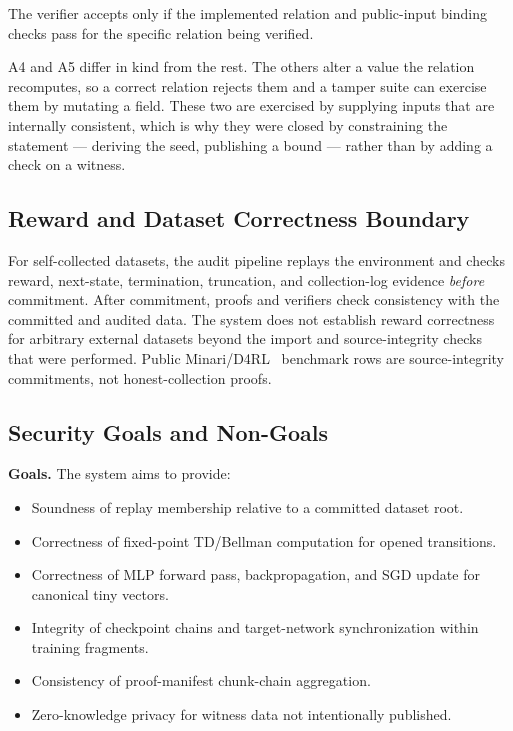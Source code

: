 The verifier accepts only if the implemented relation and public-input binding
checks pass for the specific relation being verified.

A4 and A5 differ in kind from the rest. The others alter a value the relation
recomputes, so a correct relation rejects them and a tamper suite can exercise
them by mutating a field. These two are exercised by supplying inputs that are
internally consistent, which is why they were closed by constraining the
statement --- deriving the seed, publishing a bound --- rather than by adding a
check on a witness.

\subsection{Reward and Dataset Correctness Boundary}

For self-collected datasets, the audit pipeline replays the environment and
checks reward, next-state, termination, truncation, and collection-log evidence
\emph{before} commitment. After commitment, proofs and verifiers check
consistency with the committed and audited data. The system does not establish
reward correctness for arbitrary external datasets beyond the import and
source-integrity checks that were performed. Public Minari/D4RL~\cite{minari2024, fu2020d4rl} benchmark rows are source-integrity commitments,
not honest-collection proofs.

\subsection{Security Goals and Non-Goals}

\noindent\textbf{Goals.} The system aims to provide:
\begin{itemize}[leftmargin=1.5em]
  \item Soundness of replay membership relative to a committed dataset root.
  \item Correctness of fixed-point TD/Bellman computation for opened
  transitions.
  \item Correctness of MLP forward pass, backpropagation, and SGD update for
  canonical tiny vectors.
  \item Integrity of checkpoint chains and target-network synchronization
  within training fragments.
  \item Consistency of proof-manifest chunk-chain aggregation.
  \item Zero-knowledge privacy for witness data not intentionally published.
\end{itemize}

